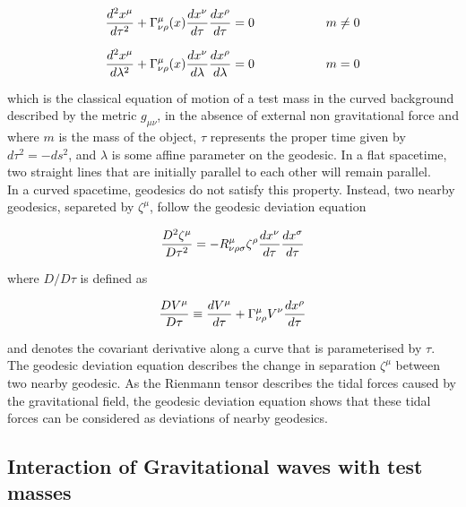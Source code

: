 \documentclass[binding=0.6cm, LaM]{sapthesis}
\begin{document}
		\begin{equation}
		{{d^2x^{\mu}}\over{d\tau^2}} + \Gamma_{\nu\rho}^{\mu}(x){{dx^{\nu}}\over{d\tau}}{{dx^{\rho}}\over{d\tau}} = 0 \hspace*{2cm} m \neq 0
		\end{equation}

		\begin{equation}
		{{d^2x^{\mu}}\over{d\lambda^2}} + \Gamma_{\nu\rho}^{\mu}(x){{dx^{\nu}}\over{d\lambda}}{{dx^{\rho}}\over{d\lambda}} = 0 \hspace*{2cm} m = 0
		\end{equation}

	which is the classical equation of motion of a test mass in the curved background described 
	by the metric $g_{\mu\nu}$, in the absence of external non gravitational force and where $m$ is the mass
	of the object, $\tau$ represents the proper time given by $d\tau^2 = -ds^2$, 
	and $\lambda$ is some affine parameter on the geodesic.
	In a flat spacetime, two straight lines that are initially parallel to each other will remain parallel. \\
	In a curved spacetime, geodesics do not satisfy this property.
	Instead, two nearby geodesics, separeted by $\zeta^{\mu}$, follow the geodesic deviation equation
		
		\begin{equation}
		{{D^2\zeta^{\mu}}\over{D\tau^2}} = -R^{\mu}_{\nu\rho\sigma}\zeta^{\rho}{{dx^{\nu}}\over{d\tau}}{{dx^{\sigma}}\over{d\tau}}
		\end{equation}

	where $D/D\tau$ is defined as

		\begin{equation}
		{{DV^{\mu}}\over{D\tau}} \equiv {{dV^{\mu}}\over{d\tau}} + \Gamma^{\mu}_{\nu\rho}V^{\nu}{{dx^{\rho}}\over{d\tau}}
		\end{equation}

	and denotes the covariant derivative along a curve that is parameterised by $\tau$. 
	The geodesic deviation equation describes the change in separation $\zeta^{\mu}$ between two nearby geodesic.
	As the Rienmann tensor describes the tidal forces caused by the gravitational field, 
	the geodesic deviation equation shows that these tidal forces can be considered as deviations of nearby geodesics.

\subsection{Interaction of Gravitational waves with test masses}
\end{document}
